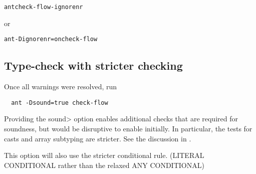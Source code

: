 \begin{alltt}
    ant check-flow-ignorenr
\end{alltt}
or
\begin{alltt}
    ant -Dignorenr=on check-flow
\end{alltt}

\subsection{Type-check with stricter checking}

Once all warnings were resolved, run 

\begin{Verbatim}
  ant -Dsound=true check-flow
\end{Verbatim}

\noindent
Providing the \<sound> option enables additional checks that are
required for soundness, but would be disruptive to enable initially.
In particular, the tests for casts and array subtyping are stricter.
See the discussion in .

This option will also use the stricter conditional rule. (LITERAL
\flowsto{} CONDITIONAL rather than the relaxed ANY \flowsto{} CONDITIONAL)



